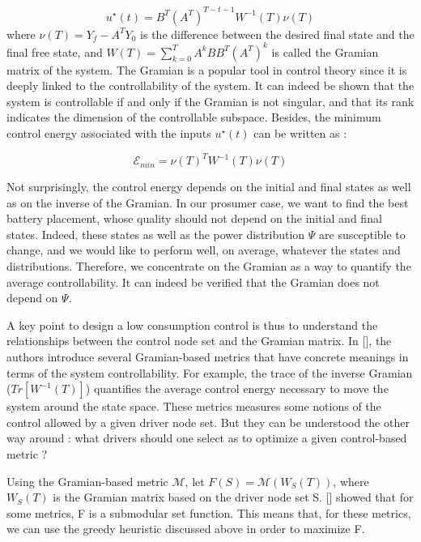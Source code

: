 \documentclass[10pt,twoside%
                ,draft%
        ]{article}
\begin{document}
\begin{equation}
 u^{\star}(t) = B^T(A^T)^{T-t-1}W^{-1}(T)\nu(T)
\end{equation}
where $ \nu(T) = Y_f - A^T Y_0 $ is the difference between the desired final state and the final free state, and $W(T) = \sum_{k=0}^{T} A^k B B^T (A^T)^k $ is called the Gramian matrix of the system. The Gramian is a popular tool in control theory since it is deeply linked to the controllability of the system. It can indeed be shown that the system is controllable if and only if the Gramian is not singular, and that its rank indicates the dimension of the controllable subspace. Besides, the minimum control energy associated with the inputs $ u^{\star}(t)$ can be written as :

\begin{equation}
 \mathcal{E}_{min} = \nu(T)^T W^{-1}(T) \nu(T)
\end{equation}

Not surprisingly, the control energy depends on the initial and final states as well as on the inverse of the Gramian. In our prosumer case, we want to find the best battery placement, whose quality should not depend on the initial and final states. Indeed, these states as well as  the power  distribution $ \Psi $ are susceptible to change, and we would like to perform well, on average, whatever the states and distributions. Therefore, we concentrate on  the Gramian as a way to quantify the average controllability. It can indeed be verified that the Gramian does not depend on $\Psi$.

A key point to design a low consumption control is thus to understand the relationships between the control node set and the Gramian matrix. In [], the authors introduce several Gramian-based metrics that have concrete meanings in terms of the system controllability. For example, the trace of the inverse Gramian ($ Tr[ W^{-1}(T)] $) quantifies the average control energy necessary to move the system around the state space. These metrics measures some notions of the control allowed by a given driver node set. But they can be understood the other way around : what drivers should one select as to optimize a given control-based metric ? 

Using the Gramian-based metric $ \mathcal{M} $, let $ F(S) =\mathcal{M}(W_S(T))$, where $ W_S(T) $  is the Gramian matrix based on the driver node set S. [] showed that for some metrics, F is a submodular set function. This means that, for these metrics, we can use the greedy heuristic discussed above in order to maximize F.
\end{document}
